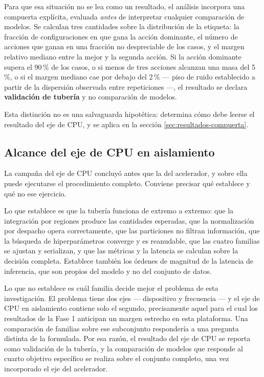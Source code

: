 \documentclass[12pt,oneside,spanish]{book}
\begin{document}
Para que esa situación no se lea como un resultado, el análisis incorpora una compuerta explícita, evaluada \textit{antes} de interpretar cualquier comparación de modelos. Se calculan tres cantidades sobre la distribución de la etiqueta: la fracción de configuraciones en que gana la acción dominante, el número de acciones que ganan en una fracción no despreciable de los casos, y el margen relativo mediano entre la mejor y la segunda acción. Si la acción dominante supera el 90\,\% de los casos, o si menos de tres acciones alcanzan una masa del 5\,\%, o si el margen mediano cae por debajo del 2\,\% --- piso de ruido establecido a partir de la dispersión observada entre repeticiones ---, el resultado se declara \textbf{validación de tubería} y no comparación de modelos.

Esta distinción no es una salvaguarda hipotética: determina cómo debe leerse el resultado del eje de CPU, y se aplica en la sección \ref{sec:resultados-compuerta}.

\subsection{Alcance del eje de CPU en aislamiento}
\label{sec:fase2-alcance-cpu}

La campaña del eje de CPU concluyó antes que la del acelerador, y sobre ella puede ejecutarse el procedimiento completo. Conviene precisar qué establece y qué no ese ejercicio.

Lo que establece es que la tubería funciona de extremo a extremo: que la integración por regiones produce las cantidades esperadas, que la normalización por despacho opera correctamente, que las particiones no filtran información, que la búsqueda de hiperparámetros converge y es reanudable, que las cuatro familias se ajustan y serializan, y que las métricas y la latencia se calculan sobre la decisión completa. Establece también los órdenes de magnitud de la latencia de inferencia, que son propios del modelo y no del conjunto de datos.

Lo que no establece es cuál familia decide mejor el problema de esta investigación. El problema tiene dos ejes --- dispositivo y frecuencia --- y el eje de CPU en aislamiento contiene solo el segundo, precisamente aquel para el cual los resultados de la Fase 1 anticipan un margen estrecho en esta plataforma. Una comparación de familias sobre ese subconjunto respondería a una pregunta distinta de la formulada. Por esa razón, el resultado del eje de CPU se reporta como validación de la tubería, y la comparación de modelos que responde al cuarto objetivo específico se realiza sobre el conjunto completo, una vez incorporado el eje del acelerador.
\end{document}
